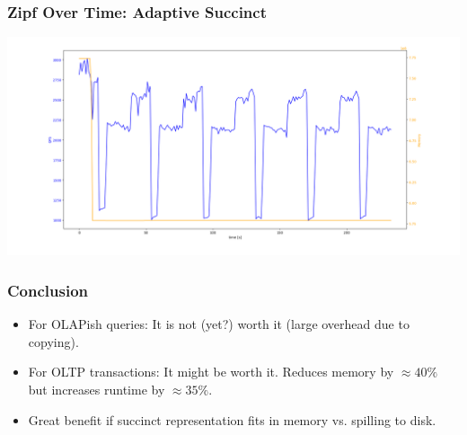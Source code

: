 \documentclass[aspectratio=43]{beamer}
\begin{document}
\begin{frame}
    \frametitle{Zipf Over Time: Adaptive Succinct}
 
    \includegraphics[width=\framewidth]{figures/plots/succinct_adaptive_large.png}   
\end{frame}

\begin{frame}
    \frametitle{Conclusion}

    \begin{itemize}
        \item For OLAPish queries: It is not (yet?) worth it (large overhead due to copying).
        \item For OLTP transactions:  It might be worth it. Reduces memory by $\approx 40\%$ but increases runtime by $\approx 35\%$.
        \item Great benefit if succinct representation fits in memory vs. spilling to disk.
    \end{itemize}
\end{frame}
\end{document}
